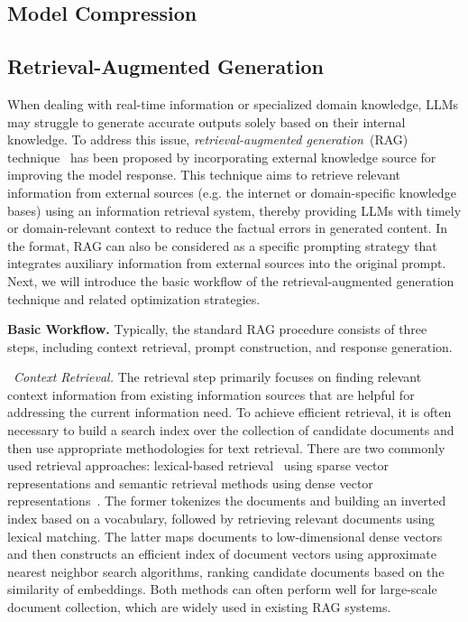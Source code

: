 \subsection{Model Compression}

\subsection{Retrieval-Augmented Generation}

When dealing with real-time information or specialized domain knowledge, LLMs may struggle to generate accurate outputs solely based on their internal knowledge. To address this issue,  \emph{retrieval-augmented generation}~(RAG) technique~\cite{ding2024survey, gao2023retrieval} has been proposed by incorporating external knowledge source for improving the model response. This technique aims to retrieve relevant information from external sources (e.g. the internet or domain-specific knowledge bases) using an information retrieval system, thereby providing LLMs with timely or domain-relevant context to reduce the factual errors in generated content. In the format, RAG can also be considered as a specific prompting strategy that integrates auxiliary information from external sources into the original prompt. Next, we will introduce the basic workflow of the retrieval-augmented generation technique and related optimization strategies.

\textbf{Basic Workflow.} Typically, the standard RAG procedure consists of three steps, including context retrieval, prompt construction, and response generation.

\textbullet~\emph{Context Retrieval.} The retrieval step primarily focuses on finding relevant context information from existing information sources that are helpful for addressing the current information need. To achieve efficient retrieval, it is often necessary to build a search index over the collection of candidate documents and then use appropriate  methodologies for text retrieval. There are two  commonly used retrieval approaches: lexical-based retrieval~\cite{robertson2009probabilistic} using sparse vector representations and semantic retrieval methods using dense vector representations~\cite{Zhao-arxiv-2022-Dense}. The former tokenizes the documents and building an inverted index based on a vocabulary, followed by retrieving relevant documents using lexical matching. The latter maps documents to low-dimensional dense vectors and then constructs an efficient index of document vectors using approximate nearest neighbor search algorithms, ranking candidate documents based on the similarity of embeddings. Both methods can often perform well for large-scale document collection, which are widely used in existing RAG systems. 

